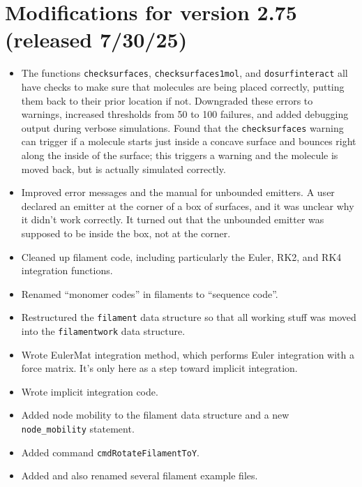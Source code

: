 \documentclass {scrbook}
\newcommand {\ttt} {\texttt}
\begin{document}
\section{Modifications for version 2.75 (released 7/30/25)}
\begin{itemize}
\item The functions \ttt{checksurfaces}, \ttt{checksurfaces1mol}, and \ttt{dosurfinteract} all have checks to make sure that molecules are being placed correctly, putting them back to their prior location if not. Downgraded these errors to warnings, increased thresholds from 50 to 100 failures, and added debugging output during verbose simulations. Found that the \ttt{checksurfaces} warning can trigger if a molecule starts just inside a concave surface and bounces right along the inside of the surface; this triggers a warning and the molecule is moved back, but is actually simulated correctly.
\item Improved error messages and the manual for unbounded emitters. A user declared an emitter at the corner of a box of surfaces, and it was unclear why it didn't work correctly. It turned out that the unbounded emitter was supposed to be inside the box, not at the corner.
\item Cleaned up filament code, including particularly the Euler, RK2, and RK4 integration functions.
\item Renamed ``monomer codes'' in filaments to ``sequence code''.
\item Restructured the \ttt{filament} data structure so that all working stuff was moved into the \ttt{filamentwork} data structure.
\item Wrote EulerMat integration method, which performs Euler integration with a force matrix. It's only here as a step toward implicit integration.
\item Wrote implicit integration code.
\item Added node mobility to the filament data structure and a new \ttt{node\_mobility} statement.
\item Added command \ttt{cmdRotateFilamentToY}.
\item Added and also renamed several filament example files.
\end{itemize}
\end{document}
